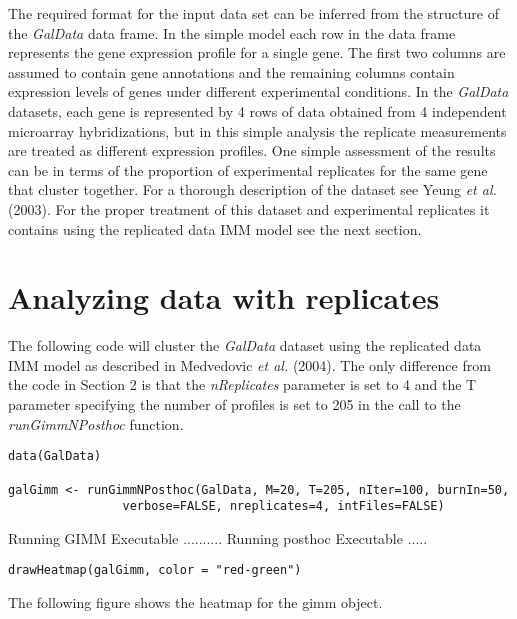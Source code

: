 \documentclass[12pt]{article}
\begin{document}
The required format for the input data set can be inferred from the structure of the \textit{GalData} data frame. 
In the simple model each row in the data frame represents the gene expression profile for a single gene. The first 
two columns are assumed to contain gene annotations and the remaining columns contain expression levels of genes 
under different experimental conditions. In the \textit{GalData} datasets, each gene is represented by 4 rows of data 
obtained from 4 independent microarray hybridizations, but in this simple analysis the replicate measurements are treated 
as different expression profiles. One simple assessment of the results can be in terms of the proportion of experimental 
replicates for the same gene that cluster together. For a thorough description of the dataset see Yeung \textit{et al.} (2003). 
For the proper treatment of this dataset and experimental replicates it contains using the replicated data IMM model see the next section. 

\section{Analyzing data with replicates}

The following code will cluster the \textit{GalData} dataset using the replicated data IMM model as described in Medvedovic \textit{et al.} (2004). 
The only difference from the code in Section 2 is that the \textit{nReplicates} parameter is set to 4 and the T parameter specifying the number of profiles is set to 205 in the call to the \textit{runGimmNPosthoc} function.

\begin{verbatim}
data(GalData)

galGimm <- runGimmNPosthoc(GalData, M=20, T=205, nIter=100, burnIn=50,
                verbose=FALSE, nreplicates=4, intFiles=FALSE)
\end{verbatim}

\begin{Schunk}
\begin{Soutput}
Running GIMM Executable ..........
Running posthoc Executable ..... 
\end{Soutput}
\end{Schunk}
\begin{verbatim}
drawHeatmap(galGimm, color = "red-green")
\end{verbatim}

The following figure shows the heatmap for the gimm object.\newline
\end{document}
